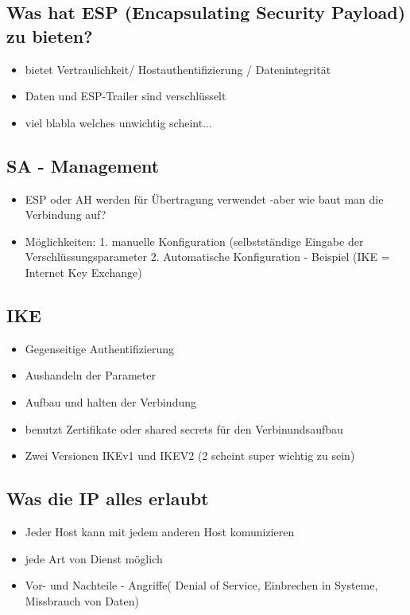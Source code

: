 \documentclass[a4paper,10pt]{scrartcl}
\begin{document}
\subsection{Was hat ESP (Encapsulating Security Payload) zu bieten?}
\begin{itemize}
 \item bietet Vertraulichkeit/ Hostauthentifizierung / Datenintegrität
 \item Daten und ESP-Trailer sind verschlüsselt
 \item viel blabla welches unwichtig scheint...
 
\end{itemize}
 \subsection{SA - Management }
\begin{itemize}
 \item ESP oder AH werden für Übertragung verwendet -aber wie baut man die Verbindung auf?
 \item Möglichkeiten: 1. manuelle Konfiguration (selbstständige Eingabe der Verschlüssungsparameter 2. Automatische Konfiguration - Beispiel (IKE = Internet
 Key Exchange)
\end{itemize}

 \subsection{IKE }
\begin{itemize}
 \item Gegenseitige Authentifizierung
 \item Aushandeln der Parameter
 \item Aufbau und halten der Verbindung
 \item benutzt Zertifikate oder shared secrets für den Verbinundsaufbau
 \item Zwei Versionen IKEv1 und IKEV2 (2 scheint super wichtig zu sein)
\end{itemize}

 \subsection{Was die IP alles erlaubt }
\begin{itemize}
 \item Jeder Host kann mit jedem anderen Host komunizieren 
 \item jede Art von Dienst möglich 
 \item Vor- und Nachteile - Angriffe( Denial of Service, Einbrechen in Systeme, Missbrauch von Daten) 
\end{itemize}
\end{document}
